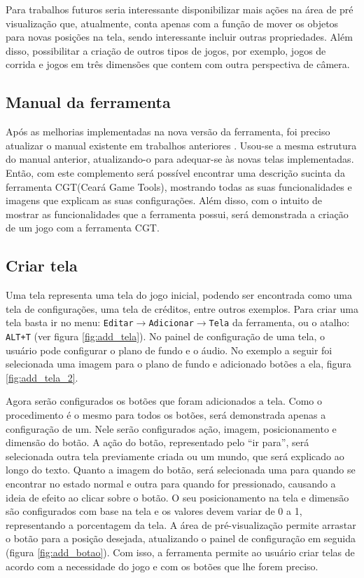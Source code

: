 \documentclass[12pt,oneside,openright,a4paper,english,brazil,sumario=tradicional]{abntex2}
\begin{document}
Para trabalhos futuros seria interessante disponibilizar mais ações na área de pré visualização que, atualmente, conta apenas com a função de mover os objetos para novas posições na tela, sendo interessante incluir outras propriedades. Além disso, possibilitar a criação de outros tipos de jogos, por exemplo, jogos de corrida e jogos em três dimensões que contem com outra perspectiva de câmera.

\postextual


\begin{anexosenv}
   \partanexos
   \chapter{Manual da ferramenta}
   \label{anex:manual-novo}

   Após as melhorias implementadas na nova versão da ferramenta, foi preciso atualizar o manual existente em trabalhos anteriores \cite{monografia:aquino}. Usou-se a mesma estrutura do manual anterior, atualizando-o para adequar-se às novas telas implementadas.
   Então, com este complemento será possível encontrar uma descrição sucinta da ferramenta CGT(Ceará Game Tools), mostrando todas as suas funcionalidades e imagens que explicam as suas configurações.
   Além disso, com o intuito de mostrar as funcionalidades que a ferramenta possui, será demonstrada a criação de um jogo com a ferramenta CGT.

   \section{Criar tela}
   Uma tela representa uma tela do jogo inicial, podendo ser encontrada como uma tela de configurações, uma tela de créditos, entre outros exemplos.
   Para criar uma tela basta ir no menu: \texttt{Editar$\rightarrow$Adicionar$\rightarrow$Tela} da ferramenta, ou o atalho: \texttt{ALT+T} (ver figura \ref{fig:add_tela}).
   No painel de configuração de uma tela, o usuário pode configurar o plano de fundo e o áudio.
   No exemplo a seguir foi selecionada uma imagem para o plano de fundo e adicionado botões a ela, figura \ref{fig:add_tela_2}.

   Agora serão configurados os botões que foram adicionados a tela.
   Como o procedimento é o mesmo para todos os botões, será demonstrada apenas a configuração de um. Nele serão configurados ação, imagem, posicionamento e dimensão do botão.
   A ação do botão, representado pelo “ir para”, será selecionada outra tela previamente criada ou um mundo, que será explicado ao longo do texto.
   Quanto a imagem do botão, será selecionada uma para quando se encontrar no estado normal e outra para quando for pressionado, causando a ideia de efeito ao clicar sobre o botão.
   O seu posicionamento na tela e dimensão são configurados com base na tela e os valores devem variar de 0 a 1, representando a porcentagem da tela. A área de pré-visualização permite arrastar o botão para a posição desejada, atualizando o painel de configuração em seguida (figura \ref{fig:add_botao}).
   Com isso, a ferramenta permite ao usuário criar telas de acordo com a necessidade do jogo e com os botões que lhe forem preciso.


\end{anexosenv}
\end{document}
